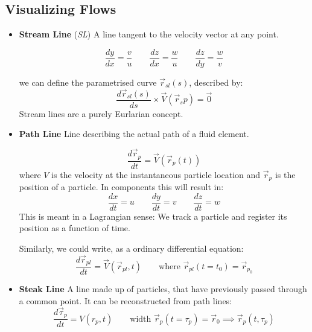 \subsection{Visualizing Flows}
\begin{itemize}
	\item \textbf{Stream Line} (\textit{SL}) A line tangent to the velocity vector at any point.

	\begin{figure}[H]
			\centering
			\label{fig:streamlineequationderivation}
	\end{figure}
	
	\begin{equation*}
		\frac{dy}{dx} = \frac vu\qquad \frac{dz}{dx} = \frac wu \qquad \frac{dz}{dy} = \frac wv
	\end{equation*}
	
	we can define the parametrised curve $\vec r_{sl}(s)$, described by:
	\begin{equation*}
		\frac{d\vec r_{sl}(s)}{ds} \times \vec V (\vec r_sp) = \vec 0
	\end{equation*}
	Stream lines are a purely Eurlarian concept.
	
	\item \textbf{Path Line} Line describing the actual path of a fluid element.

	\begin{equation*}
		\frac{d\vec r_p}{dt} = \vec V (\vec r_p(t))
	\end{equation*}
	where $V$ is the velocity at the instantaneous particle location and $\vec r_p$ is the position of a particle. In components this will result in:
	\begin{equation*}
		\frac{dx}{dt} = u\qquad \frac{dy}{dt} =v\qquad \frac{dz}{dt} = w
	\end{equation*}
	This is meant in a Lagrangian sense: We track a particle and register its position as a function of time.
	
	Similarly, we could write, as a ordinary differential equation:
	\begin{equation*}
		\frac{d\vec r_{pl}}{d t} = \vec V(\vec r_{pl},t)\qquad \text{where } \vec r_{pl} (t=t_0) = \vec r_{p_0}
	\end{equation*}
	
	
	\item \textbf{Steak Line} A line made up of particles, that have previously passed through a common point. It can be reconstructed from path lines: 
	\begin{equation*}
		\frac{d \vec \tau_p}{dt} = V(r_p,t)\qquad\text{width }\vec r_p(t=\tau_p) = \vec r_0\implies \vec r_p (t,\tau_p)
	\end{equation*}
\end{itemize}




